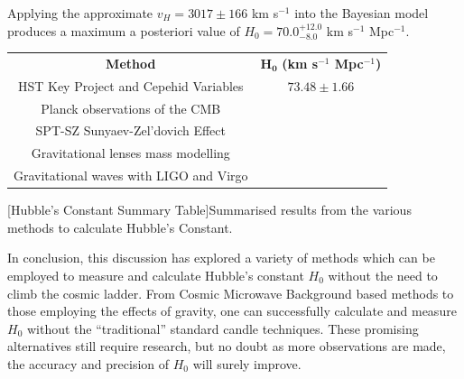 \documentclass[12pt, onecolumn]{revtex4}    %
\begin{document}
Applying the approximate $v_H=3017\pm166$ km s$^{-1}$ into the Bayesian model produces a maximum a posteriori value of $H_0=70.0^{+12.0}_{-8.0}$ km s$^{-1}$ Mpc$^{-1}$. \\


\begin{center}
\begin{tabular}{c@{\hskip 20pt}c} 
 \hline
 \textbf{Method} & $\boldsymbol{H_0}$ \textbf{(km s$^{-1}$ Mpc$^{-1}$)} \\ [0.5ex] 
 HST Key Project and Cepehid Variables & $73.48\pm1.66$ \\
 Planck observations of the CMB & \\
 SPT-SZ Sunyaev-Zel'dovich Effect & \\
 Gravitational lenses mass modelling & \\
 Gravitational waves with LIGO and Virgo & \\
 \hline
\end{tabular}
[Hubble's Constant Summary Table]{Summarised results from the various methods to calculate Hubble's Constant.}
\label{table:spectral_classification}
\end{center}

In conclusion, this discussion has explored a variety of methods which can be employed to measure and calculate Hubble's constant $H_0$ without the need to climb the cosmic ladder. From Cosmic Microwave Background based methods to those employing the effects of gravity, one can successfully calculate and measure $H_0$ without the ``traditional'' standard candle techniques. These promising alternatives still require research, but no doubt as more observations are made, the accuracy and precision of $H_0$ will surely improve. 

\newpage





\newpage
\end{document}
